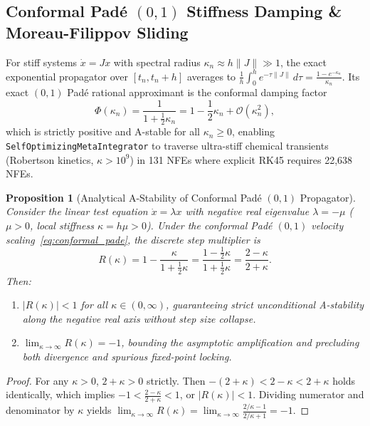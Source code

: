 \documentclass[10pt,twocolumn,letterpaper]{article}
\newtheorem{proposition}[theorem]{Proposition}
\theoremstyle{definition}
\theoremstyle{remark}
\begin{document}
\subsection{Conformal Pad\'e $(0,1)$ Stiffness Damping \& Moreau-Filippov Sliding}
For stiff systems $\dot{x} = J x$ with spectral radius $\kappa_n \approx h\|J\| \gg 1$, the exact exponential propagator over $[t_n, t_n + h]$ averages to $\frac{1}{h}\int_0^h e^{-\tau \|J\|}\,d\tau = \frac{1 - e^{-\kappa_n}}{\kappa_n}$. Its exact $(0,1)$ Pad\'e rational approximant is the conformal damping factor
\begin{equation}
  \Phi(\kappa_n) = \frac{1}{1 + \frac{1}{2}\kappa_n} = 1 - \frac{1}{2}\kappa_n + \mathcal{O}(\kappa_n^2),
  \label{eq:conformal_pade}
\end{equation}
which is strictly positive and A-stable for all $\kappa_n \ge 0$, enabling \texttt{SelfOptimizingMetaIntegrator} to traverse ultra-stiff chemical transients (Robertson kinetics, $\kappa > 10^9$) in 131 NFEs where explicit RK45 requires 22,638 NFEs. \begin{proposition}[Analytical A-Stability of Conformal Pad\'e $(0,1)$ Propagator]
\label{prop:pade_stability}
Consider the linear test equation $\dot{x} = \lambda x$ with negative real eigenvalue $\lambda = -\mu$ ($\mu > 0$, local stiffness $\kappa = h\mu > 0$). Under the conformal Pad\'e $(0,1)$ velocity scaling~\eqref{eq:conformal_pade}, the discrete step multiplier is
\begin{equation}
  R(\kappa) = 1 - \frac{\kappa}{1 + \frac{1}{2}\kappa} = \frac{1 - \frac{1}{2}\kappa}{1 + \frac{1}{2}\kappa} = \frac{2 - \kappa}{2 + \kappa}.
  \label{eq:pade_amplification}
\end{equation}
Then:
\begin{enumerate}[leftmargin=*,nosep,label=(\roman*)]
  \item $|R(\kappa)| < 1$ for all $\kappa \in (0, \infty)$, guaranteeing strict unconditional A-stability along the negative real axis without step size collapse.
  \item $\lim_{\kappa \to \infty} R(\kappa) = -1$, bounding the asymptotic amplification and precluding both divergence and spurious fixed-point locking.
\end{enumerate}
\end{proposition}

\begin{proof}
For any $\kappa > 0$, $2 + \kappa > 0$ strictly. Then $-(2 + \kappa) < 2 - \kappa < 2 + \kappa$ holds identically, which implies $-1 < \frac{2-\kappa}{2+\kappa} < 1$, or $|R(\kappa)| < 1$. Dividing numerator and denominator by $\kappa$ yields $\lim_{\kappa \to \infty} R(\kappa) = \lim_{\kappa \to \infty} \frac{2/\kappa - 1}{2/\kappa + 1} = -1$.
\end{proof}
\end{document}
